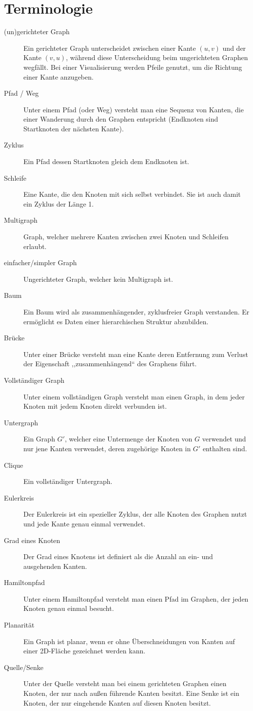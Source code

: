 \section{Terminologie}
%
\begin{description}
  \item[(un)gerichteter Graph]
    Ein gerichteter Graph unterscheidet zwischen einer Kante $(u, v)$ und der Kante $(v, u)$, während diese Unterscheidung beim ungerichteten Graphen wegfällt. Bei einer Visualisierung werden Pfeile genutzt, um die Richtung einer Kante anzugeben.
  \item[Pfad / Weg]
   Unter einem Pfad (oder Weg) versteht man eine Sequenz von Kanten, die einer Wanderung durch den Graphen entspricht (Endknoten sind Startknoten der nächsten Kante).
  \item[Zyklus]
   Ein Pfad dessen Startknoten gleich dem Endknoten ist.
  \item[Schleife]
   Eine Kante, die den Knoten mit sich selbst verbindet. Sie ist auch damit ein Zyklus der Länge 1.
  \item[Multigraph]
    Graph, welcher mehrere Kanten zwischen zwei Knoten und Schleifen erlaubt.
  \item[einfacher/simpler Graph]
    Ungerichteter Graph, welcher kein Multigraph ist.
  \item[Baum]
   Ein Baum wird als zusammenhängender, zyklusfreier Graph verstanden. Er ermöglicht es Daten einer hierarchischen Struktur abzubilden.
  \item[Brücke]
   Unter einer Brücke versteht man eine Kante deren Entfernung zum Verlust der Eigenschaft ,,zusammenhängend`` des Graphens führt.
  \item[Vollständiger Graph]
   Unter einem vollständigen Graph versteht man einen Graph, in dem jeder Knoten mit jedem Knoten direkt verbunden ist.
  \item[Untergraph]
   Ein Graph $G'$, welcher eine Untermenge der Knoten von $G$ verwendet und nur jene Kanten verwendet, deren zugehörige Knoten in $G'$ enthalten sind.
  \item[Clique]
   Ein vollständiger Untergraph.
  \item[Eulerkreis]
   Der Eulerkreis ist ein spezieller Zyklus, der alle Knoten des Graphen nutzt und jede Kante genau einmal verwendet.
  \item[Grad eines Knoten]
   Der Grad eines Knotens ist definiert als die Anzahl an ein- und ausgehenden Kanten.
  \item[Hamiltonpfad]
   Unter einem Hamiltonpfad versteht man einen Pfad im Graphen, der jeden Knoten genau einmal besucht.
  \item[Planarität]
   Ein Graph ist planar, wenn er ohne Überschneidungen von Kanten auf einer 2D-Fläche gezeichnet werden kann.
  \item[Quelle/Senke]
   Unter der Quelle versteht man bei einem gerichteten Graphen einen Knoten, der nur nach außen führende Kanten besitzt. Eine Senke ist ein Knoten, der nur eingehende Kanten auf diesen Knoten besitzt.
\end{description}

